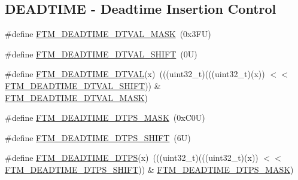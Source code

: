 \subsection*{D\+E\+A\+D\+T\+I\+ME -\/ Deadtime Insertion Control}
\begin{DoxyCompactItemize}
\item 
\#define \mbox{\hyperlink{group___f_t_m___register___masks_ga8fdaa69c3721ec4a328fadcc00d4f4df}{F\+T\+M\+\_\+\+D\+E\+A\+D\+T\+I\+M\+E\+\_\+\+D\+T\+V\+A\+L\+\_\+\+M\+A\+SK}}~(0x3\+F\+U)
\item 
\#define \mbox{\hyperlink{group___f_t_m___register___masks_ga40e02c81ec12ef23c0ce633feaf03d1a}{F\+T\+M\+\_\+\+D\+E\+A\+D\+T\+I\+M\+E\+\_\+\+D\+T\+V\+A\+L\+\_\+\+S\+H\+I\+FT}}~(0\+U)
\item 
\#define \mbox{\hyperlink{group___f_t_m___register___masks_ga3a313efb41a03923ef2e16146fb31ab2}{F\+T\+M\+\_\+\+D\+E\+A\+D\+T\+I\+M\+E\+\_\+\+D\+T\+V\+AL}}(x)~(((uint32\+\_\+t)(((uint32\+\_\+t)(x)) $<$$<$ \mbox{\hyperlink{group___f_t_m___register___masks_ga40e02c81ec12ef23c0ce633feaf03d1a}{F\+T\+M\+\_\+\+D\+E\+A\+D\+T\+I\+M\+E\+\_\+\+D\+T\+V\+A\+L\+\_\+\+S\+H\+I\+FT}})) \& \mbox{\hyperlink{group___f_t_m___register___masks_ga8fdaa69c3721ec4a328fadcc00d4f4df}{F\+T\+M\+\_\+\+D\+E\+A\+D\+T\+I\+M\+E\+\_\+\+D\+T\+V\+A\+L\+\_\+\+M\+A\+SK}})
\item 
\#define \mbox{\hyperlink{group___f_t_m___register___masks_gae0402be742f84b93af5306ac6a61706f}{F\+T\+M\+\_\+\+D\+E\+A\+D\+T\+I\+M\+E\+\_\+\+D\+T\+P\+S\+\_\+\+M\+A\+SK}}~(0x\+C0\+U)
\item 
\#define \mbox{\hyperlink{group___f_t_m___register___masks_gaa42cc1f2612186f882762059b910cd7a}{F\+T\+M\+\_\+\+D\+E\+A\+D\+T\+I\+M\+E\+\_\+\+D\+T\+P\+S\+\_\+\+S\+H\+I\+FT}}~(6\+U)
\item 
\#define \mbox{\hyperlink{group___f_t_m___register___masks_gaf1a7c61f4e08ca45f70154070500695d}{F\+T\+M\+\_\+\+D\+E\+A\+D\+T\+I\+M\+E\+\_\+\+D\+T\+PS}}(x)~(((uint32\+\_\+t)(((uint32\+\_\+t)(x)) $<$$<$ \mbox{\hyperlink{group___f_t_m___register___masks_gaa42cc1f2612186f882762059b910cd7a}{F\+T\+M\+\_\+\+D\+E\+A\+D\+T\+I\+M\+E\+\_\+\+D\+T\+P\+S\+\_\+\+S\+H\+I\+FT}})) \& \mbox{\hyperlink{group___f_t_m___register___masks_gae0402be742f84b93af5306ac6a61706f}{F\+T\+M\+\_\+\+D\+E\+A\+D\+T\+I\+M\+E\+\_\+\+D\+T\+P\+S\+\_\+\+M\+A\+SK}})
\end{DoxyCompactItemize}
